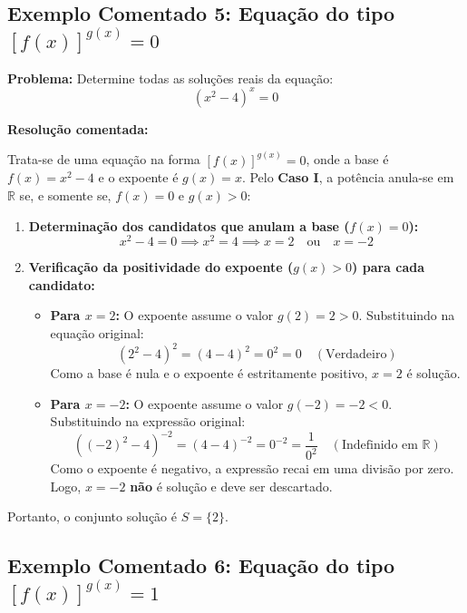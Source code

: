 \documentclass[12pt,a4paper]{report}
\begin{document}
	\subsection*{Exemplo Comentado 5: Equação do tipo $[f(x)]^{g(x)} = 0$}
	
	\textbf{Problema:} Determine todas as soluções reais da equação:
	\[
	(x^2 - 4)^x = 0
	\]
	
	\textbf{Resolução comentada:}
	
	Trata-se de uma equação na forma $[f(x)]^{g(x)} = 0$, onde a base é $f(x) = x^2 - 4$ e o expoente é $g(x) = x$. Pelo \textbf{Caso I}, a potência anula-se em $\mathbb{R}$ se, e somente se, $f(x) = 0$ e $g(x) > 0$:
	
	\begin{enumerate}[label=\textbf{\arabic*ª Etapa:}, leftmargin=*]
		\item \textbf{Determinação dos candidatos que anulam a base ($f(x) = 0$):}
		\[
		x^2 - 4 = 0 \implies x^2 = 4 \implies x = 2 \quad \text{ou} \quad x = -2
		\]
		
		\item \textbf{Verificação da positividade do expoente ($g(x) > 0$) para cada candidato:}
		\begin{itemize}
			\item \textbf{Para $x = 2$:} O expoente assume o valor $g(2) = 2 > 0$. Substituindo na equação original:
			\[
			(2^2 - 4)^2 = (4 - 4)^2 = 0^2 = 0 \quad (\text{Verdadeiro})
			\]
			Como a base é nula e o expoente é estritamente positivo, $x = 2$ é solução.
			
			\item \textbf{Para $x = -2$:} O expoente assume o valor $g(-2) = -2 < 0$. Substituindo na expressão original:
			\[
			\left((-2)^2 - 4\right)^{-2} = (4 - 4)^{-2} = 0^{-2} = \frac{1}{0^2} \quad (\text{Indefinido em } \mathbb{R})
			\]
			Como o expoente é negativo, a expressão recai em uma divisão por zero. Logo, $x = -2$ \textbf{não} é solução e deve ser descartado.
		\end{itemize}
	\end{enumerate}
	
	Portanto, o conjunto solução é $S = \{2\}$.
	
	\vspace{0.3cm}
	
	\subsection*{Exemplo Comentado 6: Equação do tipo $[f(x)]^{g(x)} = 1$}
	
\end{document}
